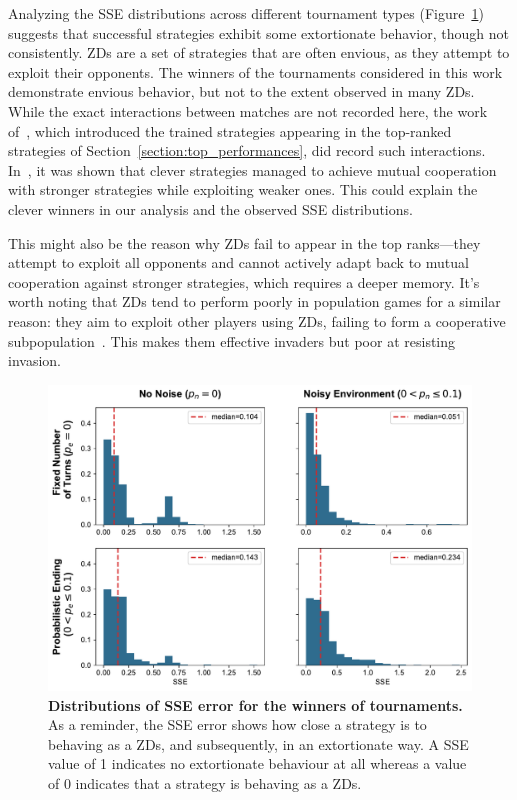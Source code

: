 \documentclass{article}
\begin{document}
Analyzing the SSE distributions across different tournament types
(Figure~\ref{fig:discussion_sse}) suggests that successful strategies exhibit
some extortionate behavior, though not consistently. ZDs are a set of strategies
that are often envious, as they attempt to exploit their opponents. The winners
of the tournaments considered in this work demonstrate envious behavior, but not
to the extent observed in many ZDs. While the exact interactions between matches
are not recorded here, the work of~\cite{Harper2017}, which introduced the
trained strategies appearing in the top-ranked strategies of
Section~\ref{section:top_performances}, did record such interactions.
In~\cite{Harper2017}, it was shown that clever strategies managed to achieve
mutual cooperation with stronger strategies while exploiting weaker ones. This
could explain the clever winners in our analysis and the observed SSE
distributions.

This might also be the reason why ZDs fail to appear in the top ranks—they
attempt to exploit all opponents and cannot actively adapt back to mutual
cooperation against stronger strategies, which requires a deeper memory. It's
worth noting that ZDs tend to perform poorly in population games for a similar
reason: they aim to exploit other players using ZDs, failing to form a
cooperative subpopulation~\cite{Knight2018evolution}. This makes them effective
invaders but poor at resisting invasion.

\begin{figure}[!htbp]
    \centering
        \centering
        \includegraphics[width=.75\textwidth]{../images/sse.pdf}
        \caption{\textbf{Distributions of SSE error for the winners of
        tournaments.} As a reminder, the SSE error shows how close a strategy is
        to behaving as a ZDs, and subsequently, in an extortionate way. A SSE
        value of 1 indicates no extortionate behaviour at all whereas a value of
        0 indicates that a strategy is behaving as a ZDs.}
        \label{fig:discussion_sse}
\end{figure}
\end{document}
